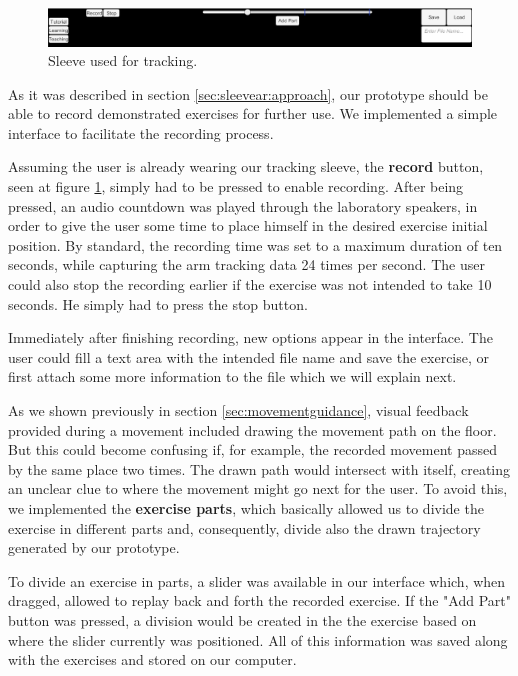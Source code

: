 \begin{figure}[!t]
    \begin{center}
        \includegraphics[width=\textwidth]{imgs/impl/recordinginterface}
    \end{center}
    \caption{Sleeve used for tracking.}
    \label{fig:recordinginterface}
\end{figure}


As it was described in section \ref{sec:sleevear:approach}, our prototype should be able to record demonstrated exercises for further use.
We implemented a simple interface to facilitate the recording process.

Assuming the user is already wearing our tracking sleeve, the \textbf{record} button, seen at figure \ref{fig:recordinginterface}, simply had to be pressed to enable recording. 
After being pressed, an audio countdown was played through the laboratory speakers, in order to give the user some time to place himself in the desired exercise initial position. 
By standard, the recording time was set to a maximum duration of ten seconds, while capturing the arm tracking data 24 times per second.
The user could also stop the recording earlier if the exercise was not intended to take 10 seconds. He simply had to press the stop button.

Immediately after finishing recording, new options appear in the interface. 
The user could fill a text area with the intended file name and save the exercise, or first attach some more information to the file which we will explain next.

As we shown previously in section \ref{sec:movementguidance}, visual feedback provided during a movement included drawing the movement path on the floor. 
But this could become confusing if, for example, the recorded movement passed by the same place two times. 
The drawn path would intersect with itself, creating an unclear clue to where the movement might go next for the user. 
To avoid this, we implemented the \textbf{exercise parts}, which basically allowed us to divide the exercise in different parts and, consequently, divide also the drawn trajectory generated by our prototype.

To divide an exercise in parts, a slider was available in our interface which, when dragged, allowed to replay back and forth the recorded exercise. 
If the "Add Part" button was pressed, a division would be created in the the exercise based on where the slider currently was positioned.
All of this information was saved along with the exercises and stored on our computer.



